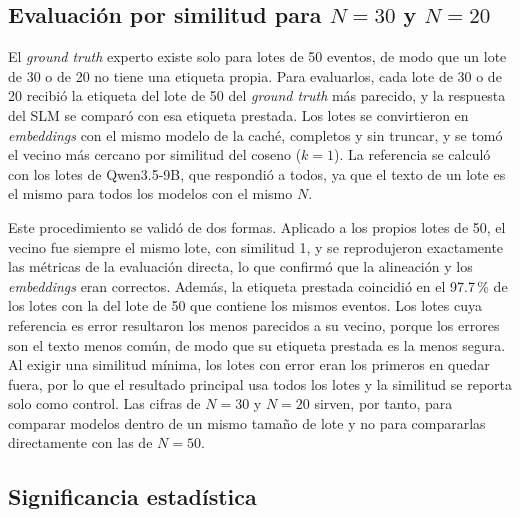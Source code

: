 
\subsection{Evaluación por similitud para $N = 30$ y $N = 20$}

El \textit{ground truth} experto existe solo para lotes de 50 eventos, de modo que un lote de 30 o de 20 no tiene una etiqueta propia. Para evaluarlos, cada lote de 30 o de 20 recibió la etiqueta del lote de 50 del \textit{ground truth} más parecido, y la respuesta del SLM se comparó con esa etiqueta prestada. Los lotes se convirtieron en \textit{embeddings} con el mismo modelo de la caché, completos y sin truncar, y se tomó el vecino más cercano por similitud del coseno ($k = 1$). La referencia se calculó con los lotes de Qwen3.5-9B, que respondió a todos, ya que el texto de un lote es el mismo para todos los modelos con el mismo $N$.

Este procedimiento se validó de dos formas. Aplicado a los propios lotes de 50, el vecino fue siempre el mismo lote, con similitud 1, y se reprodujeron exactamente las métricas de la evaluación directa, lo que confirmó que la alineación y los \textit{embeddings} eran correctos. Además, la etiqueta prestada coincidió en el 97.7\,\% de los lotes con la del lote de 50 que contiene los mismos eventos. Los lotes cuya referencia es error resultaron los menos parecidos a su vecino, porque los errores son el texto menos común, de modo que su etiqueta prestada es la menos segura. Al exigir una similitud mínima, los lotes con error eran los primeros en quedar fuera, por lo que el resultado principal usa todos los lotes y la similitud se reporta solo como control. Las cifras de $N = 30$ y $N = 20$ sirven, por tanto, para comparar modelos dentro de un mismo tamaño de lote y no para compararlas directamente con las de $N = 50$.

\subsection{Significancia estadística}\label{subsec:met_significancia}

